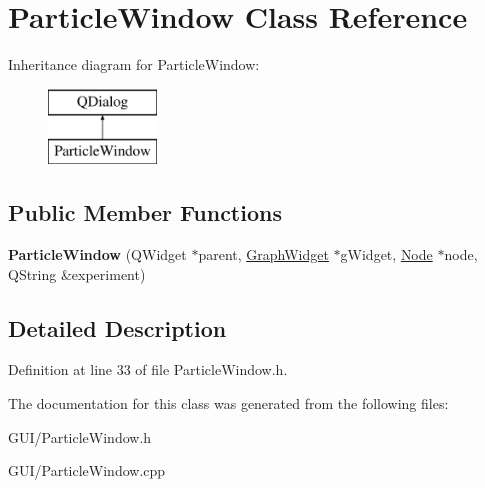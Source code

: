 \hypertarget{class_particle_window}{}\section{Particle\+Window Class Reference}
\label{class_particle_window}
Inheritance diagram for Particle\+Window\+:\begin{figure}[H]
\begin{center}
\leavevmode
\includegraphics[height=2.000000cm]{class_particle_window}
\end{center}
\end{figure}
\subsection*{Public Member Functions}
\begin{DoxyCompactItemize}
\item 
\mbox{\label{class_particle_window_a97ffd1d24fb5c226f0490ec457ec94ea}} 
{\bfseries Particle\+Window} (Q\+Widget $\ast$parent, \hyperlink{class_graph_widget}{Graph\+Widget} $\ast$g\+Widget, \hyperlink{class_node}{Node} $\ast$node, Q\+String \&experiment)
\end{DoxyCompactItemize}


\subsection{Detailed Description}


Definition at line 33 of file Particle\+Window.\+h.



The documentation for this class was generated from the following files\+:\begin{DoxyCompactItemize}
\item 
G\+U\+I/Particle\+Window.\+h\item 
G\+U\+I/Particle\+Window.\+cpp\end{DoxyCompactItemize}
